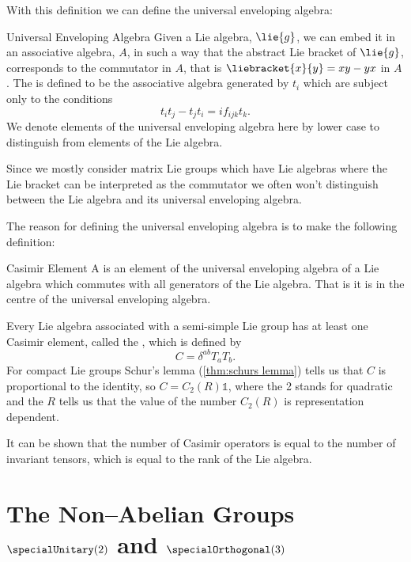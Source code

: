 \documentclass[fleqn]{NotesClass}
\newcommand*{\ident}{\mathbb{1}}
\begin{document}
    With this definition we can define the universal enveloping algebra:
    \begin{dfn}{Universal Enveloping Algebra}{}
        Given a Lie algebra, \(\lie{g}\), we can embed it in an associative algebra, \(A\), in such a way that the abstract Lie bracket of \(\lie{g}\), corresponds to the commutator in \(A\), that is \(\liebracket{x}{y} = xy - yx\) in \(A\).
        The  is defined to be the associative algebra generated by \(t_i\) which are subject only to the conditions
        \begin{equation}
            t_it_j - t_jt_i = if_{ijk}t_k.
        \end{equation}
        We denote elements of the universal enveloping algebra here by lower case to distinguish from elements of the Lie algebra.
    \end{dfn}
    Since we mostly consider matrix Lie groups which have Lie algebras where the Lie bracket can be interpreted as the commutator we often won't distinguish between the Lie algebra and its universal enveloping algebra.
    
    The reason for defining the universal enveloping algebra is to make the following definition:
    \begin{dfn}{Casimir Element}{}
        A  is an element of the universal enveloping algebra of a Lie algebra which commutes with all generators of the Lie algebra.
        That is it is in the centre of the universal enveloping algebra.
    \end{dfn}
    Every Lie algebra associated with a semi-simple Lie group has at least one Casimir element, called the , which is defined by
    \begin{equation}
        C = \delta^{ab}T_aT_b.
    \end{equation}
    For compact Lie groups Schur's lemma (\cref{thm:schurs lemma}) tells us that \(C\) is proportional to the identity, so \(C = C_2(R)\ident\), where the 2 stands for quadratic and the \(R\) tells us that the value of the number \(C_2(R)\) is representation dependent.
    
    It can be shown that the number of Casimir operators is equal to the number of invariant tensors, which is equal to the rank of the Lie algebra.
    
    \section{The Non--Abelian Groups \texorpdfstring{\(\specialUnitary(2)\)}{SU(2)} and \texorpdfstring{\(\specialOrthogonal(3)\)}{SO(3)}}
\end{document}
